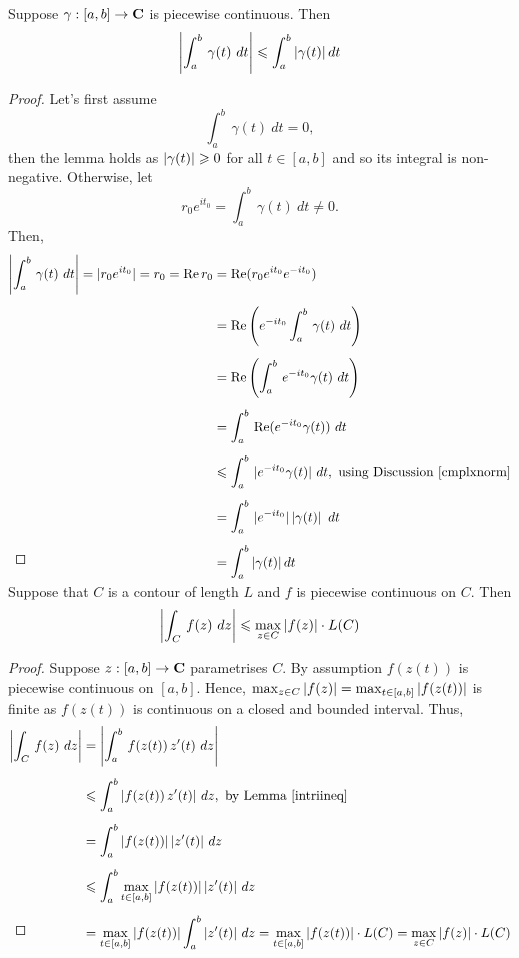 \begin{lemma}\label{intriineq}
Suppose $\gamma:[a,b] \to \mathbf C$ is piecewise continuous. Then
\[\abs{\int_a^b\,\gamma(t)\ dt} \leq \int_a^b\abs{\gamma(t)}dt\]
\end{lemma}
\begin{proof}
Let's first assume 
\[\int_a^b\,\gamma(t)\ dt = 0,\]
then the lemma holds as $\left\lvert\gamma(t)\right\rvert \geqslant 0$ for all $t \in [a,b]$ and so its integral is non-negative. Otherwise, let \[r_0e^{it_0} = \int_a^b\,\gamma(t)\ dt \neq 0.\] Then,
\begin{align*}
\left\lvert\int_a^b\,\gamma(t)\ dt\right\rvert = |r_0e^{it_0}| = r_0 = \operatorname{Re} r_0 &= \operatorname{Re} (r_0e^{it_0}e^{-it_0})\\[0.5em]
&= \operatorname{Re} \left(e^{-it_0}\int_a^b\,\gamma(t)\ dt\right)\\[0.5em]
&= \operatorname{Re} \left(\int_a^b\,e^{-it_0}\gamma(t)\ dt\right)\\[0.5em]
&= \int_a^b\,\operatorname{Re} (e^{-it_0}\gamma(t))\ dt\\[0.5em]
&\leqslant \int_a^b\,|e^{-it_0}\gamma(t)|\ dt,\ \text{using Discussion \ref{cmplxnorm}}\\[0.5em]
&= \int_a^b\,|e^{-it_0}|\left\lvert\gamma(t)\right\rvert\ dt\\[0.5em]
&= \int_a^b\left\lvert\gamma(t)\right\rvert dt\\[-3em]
\end{align*}
\end{proof}

\medskip

\begin{theorem}\label{contourtriineq}
Suppose that $C$ is a contour of length $L$ and $f$ is piecewise continuous on $C$. Then
\[\left\lvert\int_C\,f(z)\ dz\right\rvert \leqslant \max_{z \in C}\left\lvert f(z)\right\rvert \cdot L(C)\]
\end{theorem}
\begin{proof}
Suppose $z:[a,b] \to \mathbf C$ parametrises $C$. By assumption $f(z(t))$ is piecewise continuous on $[a,b]$. Hence, $\max_{z \in C}\left\lvert f(z)\right\rvert = \max_{t \in [a,b]}\left\lvert f(z(t))\right\rvert$ is finite as $f(z(t))$ is continuous on a closed and bounded interval. Thus,
\begin{align*}
\abs{\int_C\,f(z)\ dz} &= \abs{\int_a^b\,f(z(t))\,z'(t)\ dz}\\[0.5em]
 &\leq \int_a^b\abs{f(z(t))\,z'(t)}\, dz,\ \text{by Lemma \ref{intriineq}}\\[0.5em]
 &= \int_a^b\abs{f(z(t))}\abs{z'(t)}\, dz\\[0.5em]
 &\leq \int_a^b\max_{t \in [a,b]}\abs{f(z(t))}\abs{z'(t)}\, dz\\[0.5em]
 &= \max_{t \in [a,b]}\abs{f(z(t))}\int_a^b\abs{z'(t)}\, dz = \max_{t \in [a,b]}\abs{f(z(t))}\cdot L(C) = \max_{z \in C}\abs{f(z)}\cdot L(C)\\[-3em]
\end{align*}
\end{proof}

